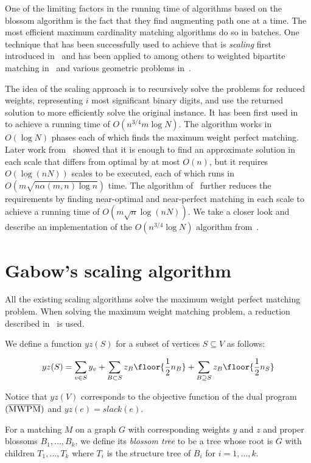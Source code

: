 
One of the limiting factors in the running time of algorithms based on the blossom algorithm is the fact that they find augmenting path one at a time. The most efficient maximum cardinality matching algorithms do so in batches. One technique that has been successfully used to achieve that is \textit{scaling} first introduced in~\cite{edmonds1972theoretical} and has been applied to among others to weighted bipartite matching in~\cite{gabow1989faster} and various geometric problems in~\cite{gabow1984scaling}. 

The idea of the scaling approach is to recursively solve the problems for reduced weights, representing $i$ most significant binary digits, and use the returned solution to more efficiently solve the original instance. It has been first used in~\cite{gabow1985scaling} to achieve a running time of $O(n^{3/4}m \log N)$. The algorithm works in $O(\log N)$ phases each of which finds the maximum weight perfect matching. Later work from~\cite{gabow1991faster} showed that it is enough to find an approximate solution in each scale that differs from optimal by at most $O(n)$, but it requires $O(\log(nN))$ scales to be executed, each of which runs in $O(m\sqrt{n \alpha(m,n)\log n})$ time. The algorithm of~\cite{duan2018scaling} further reduces the requirements by finding near-optimal and near-perfect matching in each scale to achieve a running time of $O(m \sqrt{n} \log(nN))$. We take a closer look and describe an implementation of the $O(n^{3/4}\log N)$ algorithm from~\cite{gabow1985scaling}.

\section{Gabow's scaling algorithm}

All the existing scaling algorithms solve the maximum weight perfect matching problem. When solving the maximum weight matching problem, a reduction described in~ is used.

We define a function $yz(S)$ for a subset of vertices $S \subseteq V$ as follows:

\[
yz(S) = \sum_{v \in S} y_v + \sum_{B \subset S} z_B \floor{\frac{1}{2}n_B} + \sum_{B \supseteq S} z_B \floor{\frac{1}{2}n_S}
\]

Notice that $yz(V)$ corresponds to the objective function of the dual program $(\overline{\textsc{MWPM}})$ and $yz(e) = slack(e)$.

\begin{defn}
    For a matching $M$ on a graph $G$ with corresponding weights $y$ and $z$ and proper blossoms $B_1, \dots, B_k$, we define its \emph{blossom tree} to be a tree whose root is $G$ with children $T_1, \dots, T_k$ where $T_i$ is the structure tree of $B_i$ for $i = 1, \dots, k$.
\end{defn}

